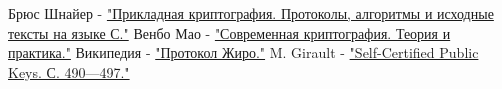 \documentclass[a4paper]{article}
\begin{document}
\begin{thebibliography}{}
      Брюс Шнайер -  \href{https://lib.mipt.ru/book/n/00013022000cdbe8096da0a688d3a130/Shnaier-B-Prikladnaya-kriptografiya-Protokoly-algoritmy-i-ishodnye-teksty-na-yazyke-S.pdf}{"Прикладная криптография. Протоколы, алгоритмы и исходные тексты на языке С."}
      Венбо Мао -  \href{https://lib.mipt.ru/book/266371/?q=+криптографические+протоколы}{"Современная криптография. Теория и практика."}
      Википедия -  \href{https://ru.wikipedia.org/wiki/Протокол_Жиро}{"Протокол Жиро."}
      M. Girault -  \href{https://doi.org/10.1007/3-540-46416-6_42}{"Self-Certified Public Keys. С. 490—497."}
\end{thebibliography}
\end{document}
